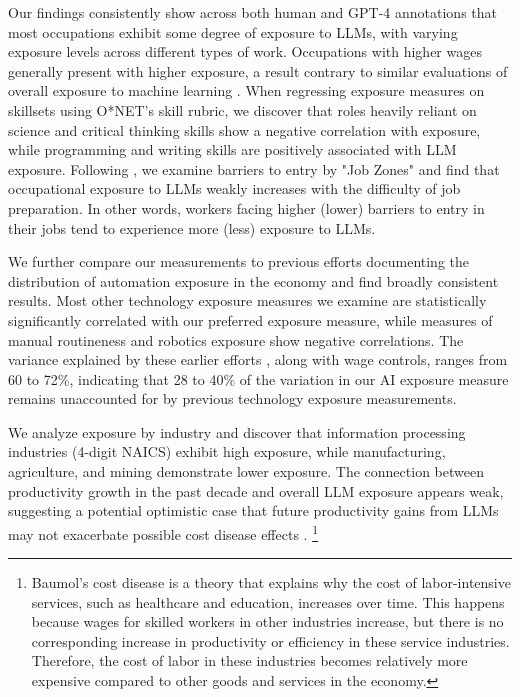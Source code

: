 \documentclass[11pt]{article}
\begin{document}
Our findings consistently show across both human and GPT-4 annotations that most occupations exhibit some degree of exposure to LLMs, with varying exposure levels across different types of work. Occupations with higher wages generally present with higher exposure, a result contrary to similar evaluations of overall exposure to machine learning \citep{brynjolfssonQuantifyingDistributionMachine2023}. When regressing exposure measures on skillsets using O*NET's skill rubric, we discover that roles heavily reliant on science and critical thinking skills show a negative correlation with exposure, while programming and writing skills are positively associated with LLM exposure. Following \citet{autor2022new}, we examine barriers to entry by "Job Zones" and find that occupational exposure to LLMs weakly increases with the difficulty of job preparation. In other words, workers facing higher (lower) barriers to entry in their jobs tend to experience more (less) exposure to LLMs.

We further compare our measurements to previous efforts documenting the distribution of automation exposure in the economy and find broadly consistent results. Most other technology exposure measures we examine are statistically significantly correlated with our preferred exposure measure, while measures of manual routineness and robotics exposure show negative correlations. The variance explained by these earlier efforts \citep{acemoglu2011skills, FreyOsborne2017, Brynjolfsson2018, SeamansRajFelten2018, Webb2020, brynjolfssonQuantifyingDistributionMachine2023}, along with wage controls, ranges from 60 to 72\%, indicating that 28 to 40\% of the variation in our AI exposure measure remains unaccounted for by previous technology exposure measurements. 

We analyze exposure by industry and discover that information processing industries (4-digit NAICS) exhibit high exposure, while manufacturing, agriculture, and mining demonstrate lower exposure. The connection between productivity growth in the past decade and overall LLM exposure appears weak, suggesting a potential optimistic case that future productivity gains from LLMs may not exacerbate possible cost disease effects \citep{baumol2012cost, aghion2018artificial}. \footnote{Baumol's cost disease is a theory that explains why the cost of labor-intensive services, such as healthcare and education, increases over time. This happens because wages for skilled workers in other industries increase, but there is no corresponding increase in productivity or efficiency in these service industries. Therefore, the cost of labor in these industries becomes relatively more expensive compared to other goods and services in the economy.} 
\end{document}
